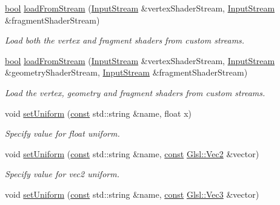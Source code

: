 \begin{DoxyCompactItemize}
\hyperlink{term__entry_8h_a002004ba5d663f149f6c38064926abac}{bool} \hyperlink{classsf_1_1_shader_a3b7958159ffb5596c4babc3052e35465}{load\-From\-Stream} (\hyperlink{classsf_1_1_input_stream}{Input\-Stream} \&vertex\-Shader\-Stream, \hyperlink{classsf_1_1_input_stream}{Input\-Stream} \&fragment\-Shader\-Stream)
\begin{DoxyCompactList}\small\item\em Load both the vertex and fragment shaders from custom streams. \end{DoxyCompactList}\item 
\hyperlink{term__entry_8h_a002004ba5d663f149f6c38064926abac}{bool} \hyperlink{classsf_1_1_shader_aa08f1c091806205e6654db9d83197fcd}{load\-From\-Stream} (\hyperlink{classsf_1_1_input_stream}{Input\-Stream} \&vertex\-Shader\-Stream, \hyperlink{classsf_1_1_input_stream}{Input\-Stream} \&geometry\-Shader\-Stream, \hyperlink{classsf_1_1_input_stream}{Input\-Stream} \&fragment\-Shader\-Stream)
\begin{DoxyCompactList}\small\item\em Load the vertex, geometry and fragment shaders from custom streams. \end{DoxyCompactList}\item 
void \hyperlink{classsf_1_1_shader_abf78e3bea1e9b0bab850b6b0a0de29c7}{set\-Uniform} (\hyperlink{term__entry_8h_a57bd63ce7f9a353488880e3de6692d5a}{const} std\-::string \&name, float x)
\begin{DoxyCompactList}\small\item\em Specify value for {\ttfamily float} uniform. \end{DoxyCompactList}\item 
void \hyperlink{classsf_1_1_shader_a4a2c673c41e37b17d67e4af1298b679f}{set\-Uniform} (\hyperlink{term__entry_8h_a57bd63ce7f9a353488880e3de6692d5a}{const} std\-::string \&name, \hyperlink{term__entry_8h_a57bd63ce7f9a353488880e3de6692d5a}{const} \hyperlink{namespacesf_1_1_glsl_adeed356d346d87634b4c197a530e4edf}{Glsl\-::\-Vec2} \&vector)
\begin{DoxyCompactList}\small\item\em Specify value for {\ttfamily vec2} uniform. \end{DoxyCompactList}\item 
void \hyperlink{classsf_1_1_shader_aad654ad8de6f0c56191fa7b8cea21db2}{set\-Uniform} (\hyperlink{term__entry_8h_a57bd63ce7f9a353488880e3de6692d5a}{const} std\-::string \&name, \hyperlink{term__entry_8h_a57bd63ce7f9a353488880e3de6692d5a}{const} \hyperlink{namespacesf_1_1_glsl_a9bdd0463b7cb5316244a082007bd50f0}{Glsl\-::\-Vec3} \&vector)

\end{DoxyCompactItemize}
